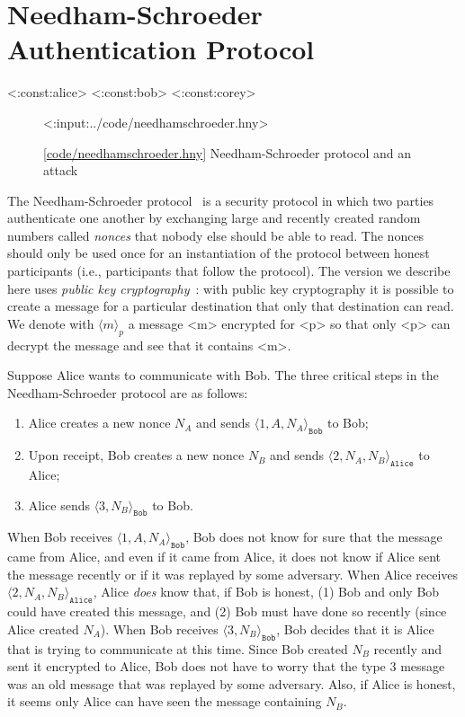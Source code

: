 \documentclass{report}
\newcommand{\harmonylink}[1]{%
[\href{https://harmony.cs.cornell.edu/#1}{\underline{#1}}]%
}
\newenvironment{code}{
\tcolorbox
}{
\endtcolorbox
}
\begin{document}
{\chapter{Needham-Schroeder Authentication Protocol}
\label{ch:ns}

<{:const:alice}>
<{:const:bob}>
<{:const:corey}>

\begin{figure}
\begin{code}
<{:input:../code/needhamschroeder.hny}>
\end{code}
\caption{\harmonylink{code/needhamschroeder.hny} Needham-Schroeder protocol and an attack}
\label{fig:ns}
\end{figure}

The Needham-Schroeder protocol~\cite{NS78} is a security protocol in which two parties
authenticate one another by exchanging large and recently created random numbers
called \emph{nonces} that nobody else should be able to read.
The nonces should only be used once for an instantiation of the protocol between
honest participants (i.e., participants that follow the protocol).
The version we describe here uses \emph{public key cryptography}~\cite{DH76}: with public key
cryptography it is possible to create a message for a particular destination that
only that destination can read.  We denote with $\langle m \rangle_p$ a message
<{m}> encrypted for <{p}> so that only <{p}> can decrypt the message and see that it contains <{m}>.

Suppose Alice wants to communicate with Bob.  The three critical steps in the
Needham-Schroeder protocol are as follows:

\begin{enumerate}
\item Alice creates a new nonce $N_A$ and sends $\langle 1, A, N_A \rangle_\mathtt{Bob}$
to Bob;
\item Upon receipt, Bob creates a new nonce $N_B$ and sends
$\langle 2, N_A, N_B \rangle_\mathtt{Alice}$ to Alice;
\item Alice sends $\langle 3, N_B \rangle_\mathtt{Bob}$ to Bob.
\end{enumerate}

When Bob receives $\langle 1, A, N_A \rangle_\mathtt{Bob}$, Bob does not know for sure
that the message came from Alice, and even if it came from Alice, it does not know if
Alice sent the message recently or if it was replayed by some adversary.
When Alice receives $\langle 2, N_A, N_B \rangle_\mathtt{Alice}$, Alice \emph{does}
know that, if Bob is honest, (1) Bob and only Bob could have created this message, and
(2) Bob must have done so recently (since Alice created $N_A$).
When Bob receives $\langle 3, N_B \rangle_\mathtt{Bob}$, Bob decides that it is Alice
that is trying to communicate at this time.  Since Bob created $N_B$ recently and sent it
encrypted to Alice, Bob does not have to worry that the type 3 message was an old message
that was replayed by some adversary.
Also, if Alice is honest, it seems only Alice can have seen the message containing $N_B$.

}
\end{document}
